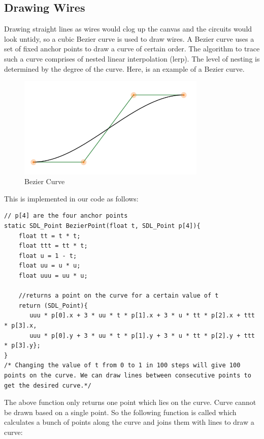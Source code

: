 \documentclass[report]{subfiles}
\begin{document}
	\subsection{Drawing Wires}
     Drawing straight lines as wires would clog up the canvas and the circuits would look untidy, so a cubic Bezier curve is used to draw wires. A Bezier curve uses a set of fixed anchor points to draw a curve of certain order. The algorithm to trace such a curve comprises of nested linear interpolation (lerp). The level of nesting is determined by the degree of the curve. Here, is an example of a Bezier curve.
	 \begin{figure}[H]
        \centering
        \includegraphics[width=0.8\textwidth]{../graphics/bezier_curve.png}
        \caption{Bezier Curve}
	\end{figure}
This is implemented in our code as follows:
\begin{lstlisting}
// p[4] are the four anchor points
static SDL_Point BezierPoint(float t, SDL_Point p[4]){
    float tt = t * t;
    float ttt = tt * t;
    float u = 1 - t;
    float uu = u * u;
    float uuu = uu * u;

	//returns a point on the curve for a certain value of t
    return (SDL_Point){
       uuu * p[0].x + 3 * uu * t * p[1].x + 3 * u * tt * p[2].x + ttt * p[3].x,
       uuu * p[0].y + 3 * uu * t * p[1].y + 3 * u * tt * p[2].y + ttt * p[3].y};
}
/* Changing the value of t from 0 to 1 in 100 steps will give 100 points on the curve. We can draw lines between consecutive points to get the desired curve.*/
\end{lstlisting}
The above function only returns one point which lies on the curve. Curve cannot be drawn based on a single point. So the following function is called which calculates a bunch of points along the curve and joins them with lines to draw a curve:
\end{document}
